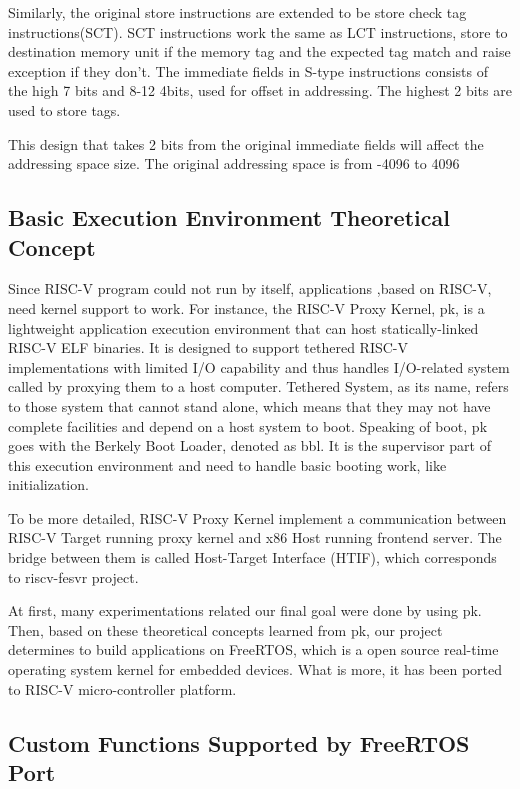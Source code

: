 \documentclass[conference]{IEEEtran}
\begin{document}
Similarly, the original store instructions are extended to be store check tag instructions(SCT). SCT instructions work the same as LCT instructions, store to destination memory unit if the memory tag and the expected tag match and raise exception if they don't. The immediate fields in S-type instructions consists of the high 7 bits and 8-12 4bits, used for offset in addressing. The highest 2 bits are used to store tags. 

This design that takes 2 bits from the original immediate fields will affect the addressing space size. The original addressing space is from -4096 to 4096

\subsection{Basic Execution Environment Theoretical Concept}

Since RISC-V program could not run by itself, applications ,based on RISC-V, need kernel support to work.  For instance, the RISC-V Proxy Kernel, pk, is a lightweight application execution environment that can host statically-linked RISC-V ELF binaries. It is designed to support tethered RISC-V implementations with limited I/O capability and thus handles I/O-related system called by proxying them to a host computer. Tethered System, as its name, refers to those system that cannot stand alone, which means that they may not have complete facilities and depend on a host system to boot. Speaking of boot, pk goes with the Berkely Boot Loader, denoted as bbl. It is the supervisor part of this execution environment and need to handle basic booting work, like initialization.

To be more detailed, RISC-V Proxy Kernel implement a communication between RISC-V Target running proxy kernel and x86 Host running frontend server. The bridge between them is called Host-Target Interface (HTIF), which corresponds to riscv-fesvr project.

At first, many experimentations related our final goal were done by using pk. Then, based on these theoretical concepts learned from pk, our project determines to build applications on FreeRTOS, which is a open source real-time operating system kernel for embedded devices. What is more, it has been ported to RISC-V micro-controller platform. 

\subsection{Custom Functions Supported by FreeRTOS Port}
\end{document}
